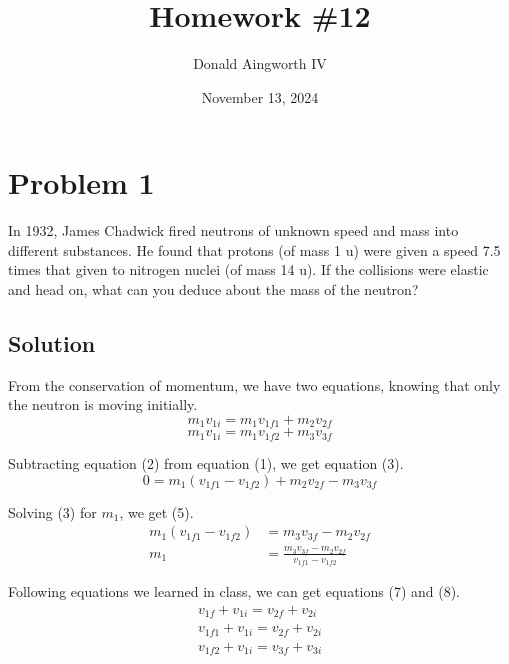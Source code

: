 \documentclass[12pt]{article}
\title{Homework \#12}
\author{Donald Aingworth IV}
\date{November 13, 2024}
\begin{document}

\maketitle

\pagebreak

\section*{Problem 1}
In 1932, James Chadwick fired neutrons of unknown speed and mass into different
substances. He found that protons (of mass 1 u) were given a speed 7.5 times that given to
nitrogen nuclei (of mass 14 u). If the collisions were elastic and head on, what can you deduce
about the mass of the neutron?

\subsection*{Solution}
From the conservation of momentum, we have two equations, knowing that only the neutron is moving initially.
\begin{equation}
    m_1v_{1i} = m_1v_{1f1} + m_2v_{2f}
\end{equation}
\begin{equation}
    m_1v_{1i} = m_1v_{1f2} + m_3v_{3f}
\end{equation}

Subtracting equation (2) from equation (1), we get equation (3).
\begin{equation}
    0 = m_1(v_{1f1} - v_{1f2}) + m_2v_{2f} - m_3v_{3f}
\end{equation}

Solving (3) for $m_1$, we get (5).
\begin{align}
    m_1(v_{1f1} - v_{1f2})  &=  m_3v_{3f} - m_2v_{2f}\\
    m_1 &=  \frac{m_3v_{3f} - m_2v_{2f}}{v_{1f1} - v_{1f2}}
\end{align}

Following equations we learned in class, we can get equations (7) and (8).
\begin{gather}
    v_{1f} + v_{1i} = v_{2f} + v_{2i}\\
    v_{1f1} + v_{1i} = v_{2f} + v_{2i}\\
    v_{1f2} + v_{1i} = v_{3f} + v_{3i}
\end{gather}
\end{document}
